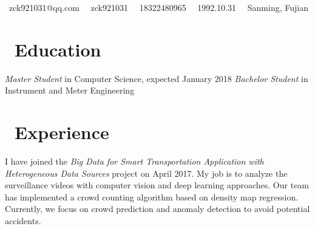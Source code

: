 \documentclass{resume}
\begin{document}
\centerline{\sffamily\large{\faEnvelope\ {zck921031@qq.com} \ \faWeixin\ zck921031 \ \faPhone\ {18322480965} \ \faBirthdayCake\ {1992.10.31} \ \faHome\ {Sanming, Fujian}} \vspace{1.0ex}}
\section{\faGraduationCap\  Education}
\textit{Master Student} in Computer Science, expected January 2018
\textit{Bachelor Student} in Instrument and Meter Engineering
\section{\faUsers\ Experience}
I have joined the \textsl{Big Data for Smart Transportation Application with Heterogeneous Data Sources} project on April 2017.
My job is to analyze the surveillance videos with computer vision and deep learning approaches.
Our team has implemented a crowd counting algorithm based on density map regression.
Currently, we focus on crowd prediction and anomaly detection to avoid potential accidents.
\end{document}
